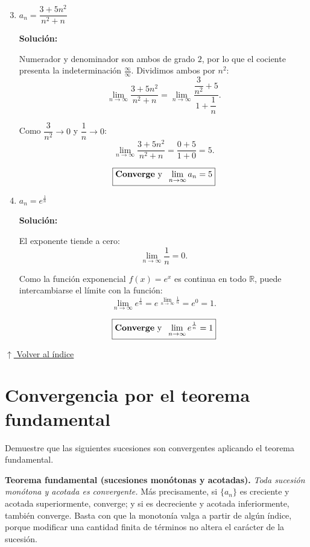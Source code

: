 \documentclass[12pt]{article}
\newcommand{\solucion}{%
    \vspace{0.8em}%
    \textbf{Solución:}%
}
\newcommand{\volverindice}{%
    \vspace{1em}%
    \begin{flushright}%
        \hyperlink{indice}{\small $\uparrow$ Volver al índice}%
    \end{flushright}%
}
\begin{document}
\begin{enumerate}[label=\alph*.-]

    \setcounter{enumi}{2} %

    \item $a_n=\dfrac{3+5n^2}{n^2+n}$

    \solucion

    Numerador y denominador son ambos de grado $2$, por lo que el cociente
    presenta la indeterminación $\frac{\infty}{\infty}$. Dividimos ambos por
    $n^2$:
    \[
    \lim_{n\to\infty}\frac{3+5n^2}{n^2+n}
    =\lim_{n\to\infty}\frac{\dfrac{3}{n^2}+5}{1+\dfrac1n} .
    \]

    Como $\dfrac{3}{n^2}\to 0$ y $\dfrac1n\to 0$:
    \[
    \lim_{n\to\infty}\frac{3+5n^2}{n^2+n}=\frac{0+5}{1+0}=5 .
    \]

    \[
    \boxed{
    \text{\textbf{Converge} y }\;\lim_{n\to\infty}a_n=5
    }
    \]

    \setcounter{enumi}{4} %

    \item $a_n=e^{\frac1n}$

    \solucion

    El exponente tiende a cero:
    \[
    \lim_{n\to\infty}\frac1n=0 .
    \]

    Como la función exponencial $f(x)=e^{x}$ es continua en todo $\mathbb{R}$,
    puede intercambiarse el límite con la función:
    \[
    \lim_{n\to\infty}e^{\frac1n}
    =e^{\,\lim\limits_{n\to\infty}\frac1n}
    =e^{0}=1 .
    \]

    \[
    \boxed{
    \text{\textbf{Converge} y }\;\lim_{n\to\infty}e^{\frac1n}=1
    }
    \]

\end{enumerate}

\volverindice
\newpage


\section{Convergencia por el teorema fundamental}

Demuestre que las siguientes sucesiones son convergentes aplicando el teorema
fundamental.

\vspace{0.5em}
\textbf{Teorema fundamental (sucesiones monótonas y acotadas).}
\emph{Toda sucesión monótona y acotada es convergente.} Más precisamente, si
$\{a_n\}$ es creciente y acotada superiormente, converge; y si es decreciente y
acotada inferiormente, también converge. Basta con que la monotonía valga a
partir de algún índice, porque modificar una cantidad finita de términos no
altera el carácter de la sucesión.
\end{document}
